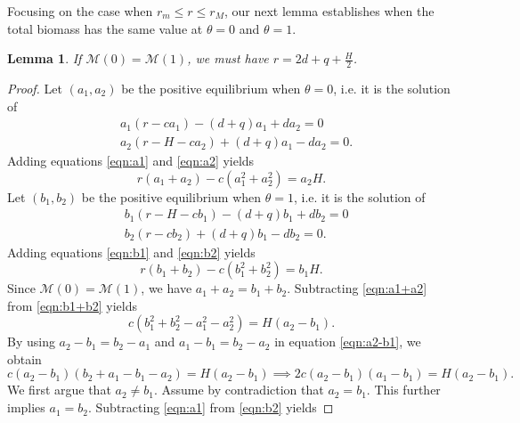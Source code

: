 \documentclass[11pt]{article}
\newtheorem{lemma}[theorem]{Lemma}
\def\MM{\mathcal{M}}
\theoremstyle{definition}
\begin{document}
Focusing on the case when $r_m\leq r \leq r_M$, our next lemma establishes when the total biomass has the same value at $\theta=0$ and $\theta=1$. 

\begin{lemma}\label{lem:M0_M1}
    If $\MM(0)=\MM(1)$, we must have $r=2d+q+\frac{H}{2}$.
\end{lemma}
\begin{proof}
    Let $(a_1,a_2)$ be the positive equilibrium when $\theta=0$, i.e. it is the solution of 
    \begin{subequations}
    \begin{align}
        &a_1(r-c a_1)-(d+q)a_1+da_2=0\label{eqn:a1}\\
        &a_2(r-H-ca_2)+(d+q)a_1-da_2=0.\label{eqn:a2}
    \end{align}   
    \end{subequations}
    Adding equations \eqref{eqn:a1} and \eqref{eqn:a2} yields
    \begin{equation}\label{eqn:a1+a2}
     r(a_1+a_2)-c(a_1^2+a_2^2)=a_2H.   
    \end{equation}
    Let $(b_1,b_2)$ be the positive equilibrium when $\theta=1$, i.e. it is the solution of 
    \begin{subequations}
    \begin{align}
        &b_1(r-H-c b_1)-(d+q)b_1+db_2=0\label{eqn:b1}\\
        &b_2(r-cb_2)+(d+q)b_1-db_2=0.\label{eqn:b2}
    \end{align}   
    \end{subequations}
    Adding equations \eqref{eqn:b1} and \eqref{eqn:b2} yields
    \begin{equation}\label{eqn:b1+b2}
     r(b_1+b_2)-c(b_1^2+b_2^2)=b_1H.   
    \end{equation}
    Since $\MM(0)=\MM(1)$, we have $a_1+a_2=b_1+b_2$. Subtracting \eqref{eqn:a1+a2} from \eqref{eqn:b1+b2} yields
    \begin{equation}\label{eqn:a2-b1}
    c(b_1^2+b_2^2-a_1^2-a_2^2) = H(a_2-b_1).
    \end{equation}
    By using $a_2-b_1=b_2-a_1$ and $a_1-b_1=b_2-a_2$ in equation \eqref{eqn:a2-b1}, we obtain
    \begin{equation}\label{eqn:a2-b1_simplified}
    c(a_2-b_1)(b_2+a_1-b_1-a_2)=H(a_2-b_1) \implies 2c(a_2-b_1)(a_1-b_1) = H(a_2-b_1).
    \end{equation}
    We first argue that $a_2\neq b_1$. Assume by contradiction that $a_2=b_1$. This further implies $a_1=b_2$. Subtracting \eqref{eqn:a1} from \eqref{eqn:b2} yields

\end{proof}
\end{document}
